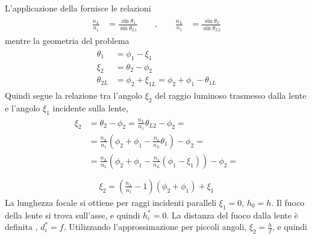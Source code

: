 \documentclass[letterpaper,10pt,italian]{jupyterBook}
\begin{document}
\sphinxAtStartPar
L’applicazione della {\hyperref[\detokenize{ch/waves/optics-phenomena:physics-hs-waves-optics-geometric-phenomena-snell}]{}} fornisce le relazioni
\begin{equation*}
\begin{split}\begin{aligned}
    \frac{n_L}{n_1} & = \frac{\sin \theta_1}{\sin \theta_{L1}} \qquad , \qquad
    \frac{n_L}{n_1} & = \frac{\sin \theta_2}{\sin \theta_{L2}} 
  \end{aligned}\end{split}
\end{equation*}
\sphinxAtStartPar
mentre la geometria del problema
\begin{equation*}
\begin{split}\begin{aligned}
  \theta_1    & = \phi_1 - \xi_1 \\
  \xi_2       & = \theta_2 - \phi_2 \\
  \theta_{2L} & = \phi_2 + \xi_{1L} = \phi_2 + \phi_1 - \theta_{1L} 
\end{aligned}\end{split}
\end{equation*}
\sphinxAtStartPar
Quindi segue la relazione tra l’angolo \(\xi_2\) del raggio luminoso trasmesso dalla lente e l’angolo \(\xi_1\) incidente sulla lente,
\begin{equation*}
\begin{split}\begin{aligned}
  \xi_2
  & = \theta_2 - \phi_2 = \frac{n_L}{n_1} \theta_{L2} - \phi_2 = \\
  & = \frac{n_L}{n_1} \left( \phi_2 + \phi_1 - \frac{n_1}{n_L} \theta_1 \right) - \phi_2 = \\
  & = \frac{n_L}{n_1} \left( \phi_2 + \phi_1 - \frac{n_1}{n_L} \left( \phi_1 - \xi_1 \right) \right) - \phi_2 = \\
\end{aligned}\end{split}
\end{equation*}\begin{equation}\label{equation:ch/waves/optics-lens:eq:lens:angles:relation}
\begin{split}
  \xi_2 = \left( \frac{n_L}{n_1} - 1 \right) \left( \phi_2 + \phi_1 \right) + \xi_1 
\end{split}
\end{equation}
\sphinxAtStartPar
{} La lunghezza focale si ottiene per raggi incidenti paralleli \(\xi_1 = 0\), \(h_0 = h\). Il fuoco della lente si trova sull’asse, e quindi \(h^*_i = 0\). La distanza del fuoco dalla lente è definita , \(d^*_i = f\). Utilizzando l’approssimazione per piccoli angoli, \(\xi_2 = \frac{h}{f}\), e quindi
\end{document}
